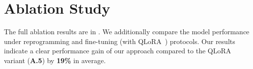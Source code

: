 \section{Ablation Study}



The full ablation results are in . We additionally compare the model performance under reprogramming and fine-tuning (with QLoRA~\cite{dettmers2023qlora}) protocols. Our results indicate a clear performance gain of our approach compared to the QLoRA variant (\textbf{A.5}) by \textbf{19\%} in average.